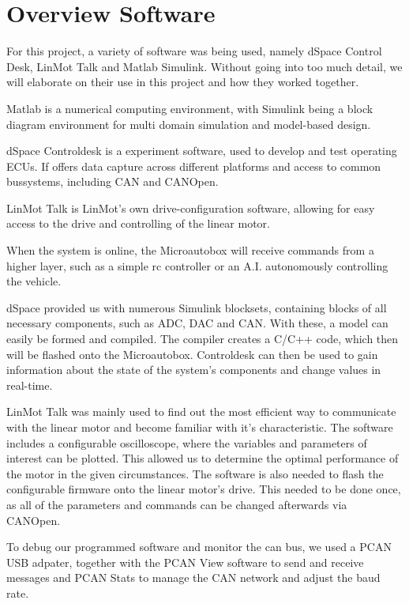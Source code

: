 
\chapter{Overview Software}
\label{chp:Software}

For this project, a variety of software was being used, namely dSpace Control Desk, LinMot Talk and Matlab Simulink. Without going into too much detail, we will elaborate on their use in this project and how they worked together.


Matlab is a numerical computing environment, with Simulink being a block diagram environment for multi domain simulation and model-based design.

dSpace Controldesk is a experiment software, used to develop and test operating ECUs. If offers data capture across different platforms and access to common bussystems, including CAN and CANOpen.

LinMot Talk is LinMot's own drive-configuration software, allowing for easy access to the drive and controlling of the linear motor.

When the system is online, the Microautobox will receive commands from a higher layer, such as a simple rc controller or an A.I. autonomously controlling the vehicle. 

dSpace provided us with numerous Simulink blocksets, containing blocks of all necessary components, such as ADC, DAC and CAN. With these, a model can easily be formed and compiled. The compiler creates a C/C++ code, which then will be flashed onto the Microautobox. Controldesk can then be used to gain information about the state of the system's components and change values in real-time.

LinMot Talk was mainly used to find out the most efficient way to communicate with the linear motor and become familiar with it's characteristic. The software includes a configurable oscilloscope, where the variables and parameters of interest can be plotted. This allowed us to determine the optimal performance of the motor in the given circumstances.
The software is also needed to flash the configurable firmware onto the linear motor's drive. This needed to be done once, as all of the parameters and commands can be changed afterwards via CANOpen.

To debug our programmed software and monitor the can bus, we used a PCAN USB adpater, together with the PCAN View software to send and receive messages and PCAN Stats to manage the CAN network and adjust the baud rate.

